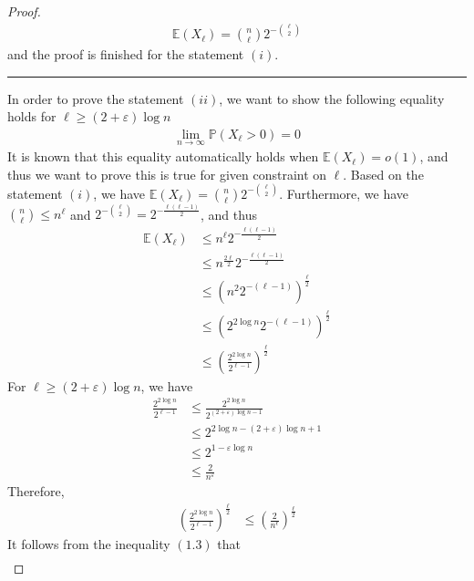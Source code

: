 \begin{proof}
  \begin{align*}
    \mathbb{E}(X_{\ell}) = \binom{n}{\ell} 2^{-\binom{\ell}{2}}
  \end{align*}
  and the proof is finished for the statement $(i)$.
  \vspace{5pt}
  \hrule
  In order to prove the statement $(ii)$, we want to show the following equality holds for $\ell \geq (2+\varepsilon) \log n$
  \begin{align*}
    \lim\limits_{n \to \infty} \mathbb{P}(X_{\ell} > 0) = 0  \tag{1.2}
  \end{align*}
  It is known that this equality automatically holds when $\mathbb{E}(X_{\ell}) = o(1)$, and thus we want to prove this is true for given constraint on $\ell$. Based on the statement $(i)$, we have $\mathbb{E}(X_{\ell}) = \binom{n}{\ell} 2^{-\binom{\ell}{2}}$. Furthermore, we have $\binom{n}{\ell} \leq n^{\ell}$ and $2^{-\binom{\ell}{2}} = 2^{-\frac{\ell(\ell-1)}{2}}$, and thus 
  \begin{align*}
    \mathbb{E}(X_{\ell}) &\leq n^{\ell} 2^{-\frac{\ell(\ell-1)}{2}} \\
                         &\leq n^{\frac{2\ell}{2}} 2^{-\frac{\ell(\ell-1)}{2}} \\
                         &\leq \left( n^{2} 2^{-(\ell-1)} \right)^{\frac{\ell}{2}} \\
                         &\leq \left( 2^{2 \log n} 2^{-(\ell-1)} \right)^{\frac{\ell}{2}} \\
                         &\leq \left( \frac{2^{2 \log n}}{2^{\ell-1}} \right)^{\frac{\ell}{2}} \tag{1.3}
  \end{align*}
  For $\ell \geq (2+\varepsilon) \log n$, we have
  \begin{align*}
    \frac{2^{2 \log n}}{2^{\ell-1}} &\leq \frac{2^{2 \log n}}{2^{(2+\varepsilon) \log n - 1}} \\
                                    &\leq 2^{2 \log n - (2+\varepsilon) \log n + 1} \\
                                    &\leq 2^{1- \varepsilon \log n} \\
                                    &\leq \frac{2}{n^{\varepsilon}}
  \end{align*}
  Therefore,
  \begin{align*}
    \left( \frac{2^{2 \log n}}{2^{\ell-1}} \right)^{\frac{\ell}{2}} &\leq \left( \frac{2}{n^{\epsilon}} \right)^{\frac{\ell}{2}}
  \end{align*}
  It follows from the inequality $(1.3)$ that
  \begin{align*}

\end{align*}
\end{proof}
